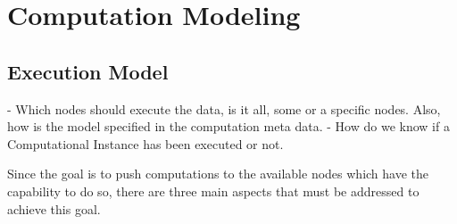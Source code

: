 \section{Computation Modeling}

\subsection{Execution Model}
- Which nodes should execute the data, is it all, some  or a specific nodes. Also, how is the model specified in the computation meta data.
- How do we know if a Computational Instance has been executed or not.

Since the goal is to push computations to the available nodes which have the capability to do so, there are three main aspects that must be addressed to achieve this goal.
